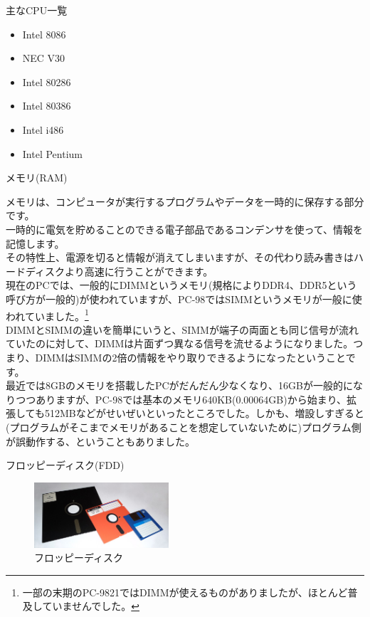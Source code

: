 \documentclass[b5paper,9pt,platex,dvipdfmx]{jsarticle}
\begin{document}
\begin{multicols}{3}
\begin{enumerate}
\begin{itembox}[l]{主なCPU一覧}
  \begin{itemize}
    \item Intel 8086
    \item NEC V30
    \item Intel 80286
    \item Intel 80386
    \item Intel i486
    \item Intel Pentium
  \end{itemize}
\end{itembox}
  {\bf  \item メモリ(RAM)\\}
  メモリは、コンピュータが実行するプログラムやデータを一時的に保存する部分です。\\
  一時的に電気を貯めることのできる電子部品であるコンデンサを使って、情報を記憶します。\\
  その特性上、電源を切ると情報が消えてしまいますが、その代わり読み書きはハードディスクより高速に行うことができます。\\
  現在のPCでは、一般的にDIMMというメモリ(規格によりDDR4、DDR5という呼び方が一般的)が使われていますが、PC-98ではSIMMというメモリが一般に使われていました。\footnote{一部の末期のPC-9821ではDIMMが使えるものがありましたが、ほとんど普及していませんでした。}\\
  DIMMとSIMMの違いを簡単にいうと、SIMMが端子の両面とも同じ信号が流れていたのに対して、DIMMは片面ずつ異なる信号を流せるようになりました。つまり、DIMMはSIMMの2倍の情報をやり取りできるようになったということです。\\
  最近では8GBのメモリを搭載したPCがだんだん少なくなり、16GBが一般的になりつつありますが、PC-98では基本のメモリ640KB(0.00064GB)から始まり、拡張しても512MBなどがせいぜいといったところでした。しかも、増設しすぎると(プログラムがそこまでメモリがあることを想定していないために)プログラム側が誤動作する、ということもありました。\\
  {\bf  \item フロッピーディスク(FDD)\\}
  \begin{figure}[H]
    \centering
    \includegraphics[width=5cm]{img-3.jpg}
    \caption{フロッピーディスク}
  \end{figure}

\end{enumerate}
\end{multicols}
\end{document}
